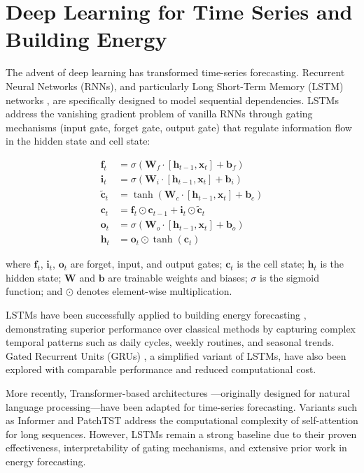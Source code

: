 \documentclass[12pt,a4paper]{report}
\begin{document}
\section{Deep Learning for Time Series and Building Energy}

The advent of deep learning has transformed time-series forecasting. Recurrent Neural Networks (RNNs), and particularly Long Short-Term Memory (LSTM) networks \cite{hochreiter1997long}, are specifically designed to model sequential dependencies. LSTMs address the vanishing gradient problem of vanilla RNNs through gating mechanisms (input gate, forget gate, output gate) that regulate information flow in the hidden state and cell state:

\begin{align}
\mathbf{f}_t &= \sigma(\mathbf{W}_f \cdot [\mathbf{h}_{t-1}, \mathbf{x}_t] + \mathbf{b}_f) \\
\mathbf{i}_t &= \sigma(\mathbf{W}_i \cdot [\mathbf{h}_{t-1}, \mathbf{x}_t] + \mathbf{b}_i) \\
\tilde{\mathbf{c}}_t &= \tanh(\mathbf{W}_c \cdot [\mathbf{h}_{t-1}, \mathbf{x}_t] + \mathbf{b}_c) \\
\mathbf{c}_t &= \mathbf{f}_t \odot \mathbf{c}_{t-1} + \mathbf{i}_t \odot \tilde{\mathbf{c}}_t \\
\mathbf{o}_t &= \sigma(\mathbf{W}_o \cdot [\mathbf{h}_{t-1}, \mathbf{x}_t] + \mathbf{b}_o) \\
\mathbf{h}_t &= \mathbf{o}_t \odot \tanh(\mathbf{c}_t)
\end{align}

where \(\mathbf{f}_t\), \(\mathbf{i}_t\), \(\mathbf{o}_t\) are forget, input, and output gates; \(\mathbf{c}_t\) is the cell state; \(\mathbf{h}_t\) is the hidden state; \(\mathbf{W}\) and \(\mathbf{b}\) are trainable weights and biases; \(\sigma\) is the sigmoid function; and \(\odot\) denotes element-wise multiplication.

LSTMs have been successfully applied to building energy forecasting \cite{roh2016development, mocanu2016deep}, demonstrating superior performance over classical methods by capturing complex temporal patterns such as daily cycles, weekly routines, and seasonal trends. Gated Recurrent Units (GRUs) \cite{cho2014learning}, a simplified variant of LSTMs, have also been explored with comparable performance and reduced computational cost.

More recently, Transformer-based architectures \cite{vaswani2017attention}—originally designed for natural language processing—have been adapted for time-series forecasting. Variants such as Informer \cite{zhou2021informer} and PatchTST \cite{nie2023patchtst} address the computational complexity of self-attention for long sequences. However, LSTMs remain a strong baseline due to their proven effectiveness, interpretability of gating mechanisms, and extensive prior work in energy forecasting.
\end{document}

